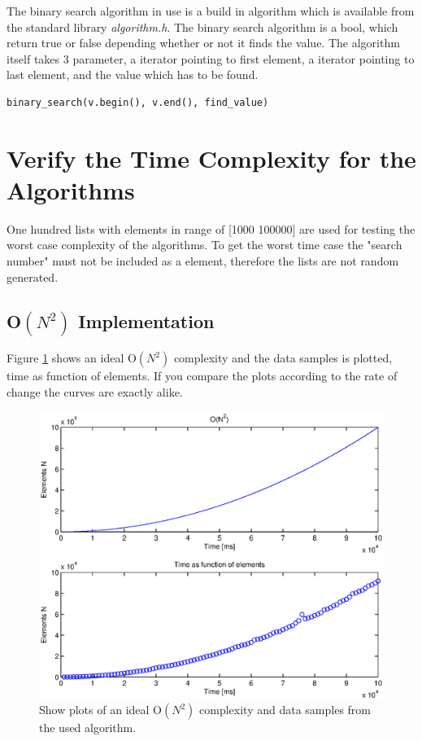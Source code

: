 The binary search algorithm in use is a build in algorithm which is available from the standard library \emph{algorithm.h}. The binary search algorithm is a bool, which return true or false depending whether or not it finds the value. The algorithm itself takes 3 parameter, a iterator pointing to first element, a iterator pointing to last element, and the value which has to be found. 
\begin{lstlisting}
binary_search(v.begin(), v.end(), find_value)
\end{lstlisting}

\newpage
\section{Verify the Time Complexity for the Algorithms}
\label{sec:ver}
One hundred lists with elements in range of [1000 100000] are used for testing the worst case complexity of the algorithms. To get the worst time case the "search number" must not be included as a element, therefore the lists are not random generated. 

\subsection{O\(\left( { N }^{ 2 } \right)\) Implementation}
Figure \ref{fig:test1} shows an ideal O\(\left( { N }^{ 2 } \right)\) complexity and the data samples is plotted, time as function of elements. If you compare the plots according to the rate of change the curves are exactly alike. \\

\begin{figure}[th!]
\centering
\includegraphics[width=1\textwidth]{./graphics/test1.eps}
\caption{Show plots of an ideal O\(\left( { N }^{ 2 } \right)\) complexity and data samples from the used algorithm.}
\label{fig:test1}
\end{figure}

